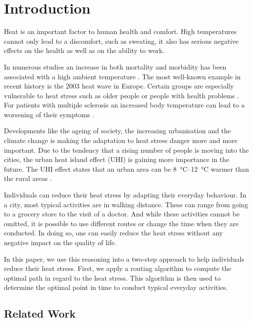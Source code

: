 
\section{Introduction}

Heat is an important factor to human health and comfort. High temperatures cannot only lead to a discomfort, such as sweating, it also has serious negative effects on the health as well as on the ability to work. 

In numerous studies an increase in both mortality and
morbidity has been associated with a high ambient temperature \parencite{Basu2009}. The most well-known example in recent history is the 2003 heat wave in Europe. 
Certain groups are especially vulnerable to heat stress such as older people or people with health problems \parencite{Huebler2007}. For patients with multiple sclerosis an increased body temperature can lead to a worsening of their symptoms \parencite{Davis2010}.

Developments like the ageing of society, the increasing urbanisation and the climate change is making the adaptation to heat stress danger more and more important. Due to the tendency that a rising number of people is moving into the cities, the urban heat island effect (UHI) is gaining more importance in the future. The UHI effect states that an urban area can be  \SIrange{8}{12}{\celsius} warmer than the rural areas \parencite{Prashad2014}. 

Individuals can reduce their heat stress by adapting their everyday behaviour. In a city, most typical activities are in walking distance. These can range from going to a grocery store to the visit of a doctor. And while these activities cannot be omitted, it is possible to use different routes or change the time when they are conducted. In doing so, one can easily reduce the heat stress without any negative impact on the quality of life. 

In this paper, we use this reasoning into a two-step approach to help individuals reduce their heat stress. First, we apply a routing algorithm to compute the optimal path in regard to the heat stress. This algorithm is then used to determine the optimal point in time to conduct typical everyday activities. 
  
\subsection{Related Work} 


